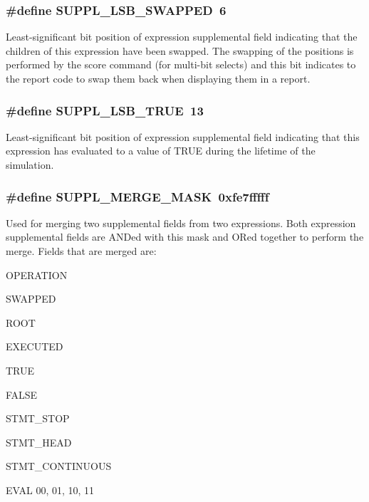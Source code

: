 \subsubsection{\setlength{\rightskip}{0pt plus 5cm}\#define SUPPL\_\-LSB\_\-SWAPPED\ 6}\label{group__expr__suppl_a1}


Least-significant bit position of expression supplemental field indicating that the children of this expression have been swapped. The swapping of the positions is performed by the score command (for multi-bit selects) and this bit indicates to the report code to swap them back when displaying them in a report. 
\subsubsection{\setlength{\rightskip}{0pt plus 5cm}\#define SUPPL\_\-LSB\_\-TRUE\ 13}\label{group__expr__suppl_a8}


Least-significant bit position of expression supplemental field indicating that this expression has evaluated to a value of TRUE during the lifetime of the simulation. 
\subsubsection{\setlength{\rightskip}{0pt plus 5cm}\#define SUPPL\_\-MERGE\_\-MASK\ 0xfe7fffff}\label{group__expr__suppl_a20}


Used for merging two supplemental fields from two expressions. Both expression supplemental fields are ANDed with this mask and ORed together to perform the merge. Fields that are merged are:\begin{CompactItemize}
\item 
OPERATION\item 
SWAPPED\item 
ROOT\item 
EXECUTED\item 
TRUE\item 
FALSE\item 
STMT\_\-STOP\item 
STMT\_\-HEAD\item 
STMT\_\-CONTINUOUS\item 
EVAL 00, 01, 10, 11 \end{CompactItemize}
